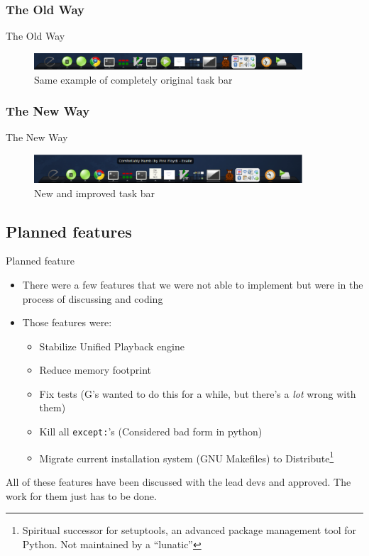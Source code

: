 \documentclass{beamer}
\begin{document}
\subsubsection{The Old Way}
\begin{frame}{The Old Way}
  \begin{figure}
    \centering
    \includegraphics[width=100mm]{images/awn}
    \caption{Same example of completely original task bar}
  \end{figure}
\end{frame}

\subsubsection{The New Way}
\begin{frame}{The New Way}
  \begin{figure}
    \centering
    \includegraphics[width=100mm]{images/awn-new}
    \caption{New and improved task bar}
  \end{figure}
\end{frame}

\subsection{Planned features}
\begin{frame}{Planned feature}
  \begin{itemize}
    \item There were a few features that we were not able to implement but
      were in the process of discussing and coding
    \item Those features were:
    \begin{itemize}
      \item Stabilize Unified Playback engine
      \item Reduce memory footprint
      \item Fix tests (G's wanted to do this for a while, but there's a
        \emph{lot} wrong with them)
      \item Kill all \lstinline!except:!'s (Considered bad form in python)
      \item Migrate current installation system (GNU Makefiles) to
        Distribute\footnote{Spiritual successor for setuptools, an advanced
        package management tool for Python. Not maintained by a ``lunatic''}
    \end{itemize}
  \end{itemize}
  All of these features have been discussed with the lead devs and approved.
  The work for them just has to be done.
\end{frame}
\end{document}
